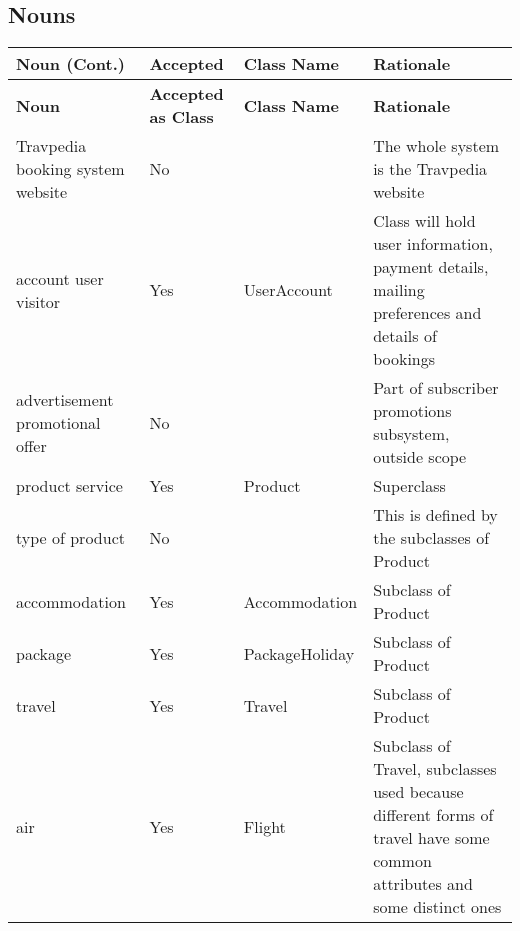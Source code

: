\subsection{Nouns}

\renewcommand*{\arraystretch}{1.3}
\begin{longtable}{m{2.8cm} >{\centering\arraybackslash}m{1.6cm} >{\centering\arraybackslash}m{2.8cm} m{5.8cm}}
	\toprule
	\textbf{Noun (Cont.)} & \textbf{Accepted} & \textbf{Class Name} & \textbf{Rationale} \\
	\endhead
	\toprule
	\textbf{Noun} & \textbf{Accepted as Class} & \textbf{Class Name} & \textbf{Rationale} \\
	\endfirsthead
	\midrule
	Travpedia \newline
	booking system \newline
	website
	& No &  & The whole system is the Travpedia website \\

	\midrule
	account \newline
	user \newline
	visitor
	& Yes & UserAccount & Class will hold user information, payment details,
	mailing preferences and details of bookings \\

	\midrule
	advertisement \newline
	promotional offer
	& No &  & Part of subscriber promotions subsystem, outside scope \\

	\midrule
	product \newline
	service
	& Yes & Product & Superclass \\

	\midrule
	type of product
	& No &  & This is defined by the subclasses of Product \\

	\midrule
	accommodation
	& Yes & Accommodation & Subclass of Product \\

	\midrule
	package
	& Yes & PackageHoliday & Subclass of Product \\

	\midrule
	travel
	& Yes & Travel & Subclass of Product \\

	\midrule
	air
	& Yes & Flight & Subclass of Travel, subclasses used because different
	forms of travel have some common attributes and some distinct ones \\


\end{longtable}
